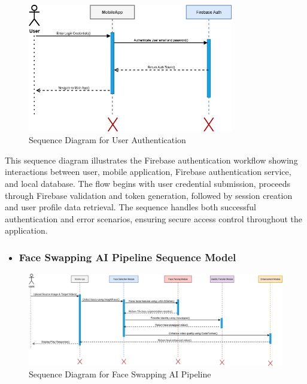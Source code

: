 \documentclass[12pt,a4paper]{report}
\begin{document}
\begin{figure}[H]
\centering
\includegraphics[width=0.8\textwidth]{figures/user_authentication_sequence.png}
\caption{Sequence Diagram for User Authentication}
\label{fig:authentication_sequence}
\end{figure}

This sequence diagram illustrates the Firebase authentication workflow showing interactions between user, mobile application, Firebase authentication service, and local database. The flow begins with user credential submission, proceeds through Firebase validation and token generation, followed by session creation and user profile data retrieval. The sequence handles both successful authentication and error scenarios, ensuring secure access control throughout the application.


\begin{landscape}
\begin{itemize}
    \item \subsubsection{Face Swapping AI Pipeline Sequence Model}
\end{itemize}
\begin{figure}[H]
\centering
\includegraphics[width=1.5\textwidth]{figures/face_swapping_pipeline_sequence.png}
\caption{Sequence Diagram for Face Swapping AI Pipeline}
\label{fig:face_swapping_pipeline_sequence}
\end{figure}
\end{landscape}
\end{document}
